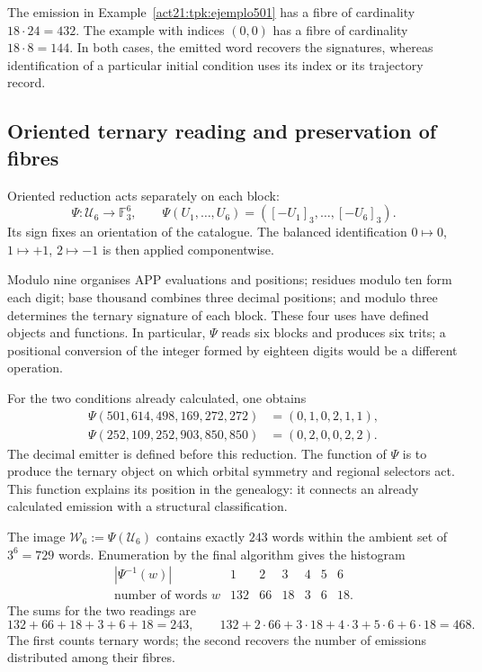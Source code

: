 The emission in Example~\ref{act21:tpk:ejemplo501} has a fibre of cardinality
\(18\cdot24=432\). The example with indices \((0,0)\) has a fibre of
cardinality \(18\cdot8=144\). In both cases, the emitted word recovers
the signatures, whereas identification of a particular initial condition
uses its index or its trajectory record.

\subsection{Oriented ternary reading and preservation of fibres}
\label{act21:tpk:reduccion-ternaria}

Oriented reduction acts separately on each block:
\begin{equation}
 \Psi:\mathcal U_6\longrightarrow\mathbb F_3^6,\qquad
 \Psi(U_1,\ldots,U_6)=([-U_1]_3,\ldots,[-U_6]_3).
 \label{act21:tpk:psi}
\end{equation}
Its sign fixes an orientation of the catalogue. The balanced identification
\(0\mapsto0\), \(1\mapsto+1\), \(2\mapsto-1\) is then applied
componentwise.

Modulo nine organises APP evaluations and positions; residues modulo ten
form each digit; base thousand combines three decimal positions; and
modulo three determines the ternary signature of each block. These four
uses have defined objects and functions. In particular, \(\Psi\) reads
six blocks and produces six trits; a positional conversion of the integer
formed by eighteen digits would be a different operation.

For the two conditions already calculated, one obtains
\begin{align*}
 \Psi(501,614,498,169,272,272)&=(0,1,0,2,1,1),\\
 \Psi(252,109,252,903,850,850)&=(0,2,0,0,2,2).
\end{align*}
The decimal emitter is defined before this reduction. The function of
\(\Psi\) is to produce the ternary object on which orbital symmetry and
regional selectors act. This function explains its position in the
genealogy: it connects an already calculated emission with a structural
classification.

The image \(\mathcal W_6:=\Psi(\mathcal U_6)\) contains exactly \(243\)
words within the ambient set of \(3^6=729\) words. Enumeration by the
final algorithm gives the histogram
\begin{equation}
\begin{array}{c|rrrrrr}
 |\Psi^{-1}(w)|&1&2&3&4&5&6\\\hline
 \text{number of words }w&132&66&18&3&6&18.
\end{array}
\label{act21:tpk:fibras-ternarias}
\end{equation}
The sums for the two readings are
\[
132+66+18+3+6+18=243,
\qquad132+2\cdot66+3\cdot18+4\cdot3+5\cdot6+6\cdot18=468.
\]
The first counts ternary words; the second recovers the number of
emissions distributed among their fibres.

